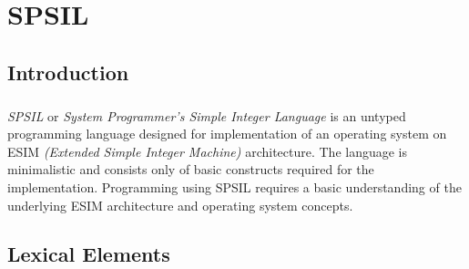 %
%
%
%
%
%
%
\chapter{SPSIL}
 \newcommand{\kw}[1]{\texttt{#1}}


\thispagestyle{plain}



\section{Introduction}
\paragraph{}
\textit{SPSIL} or \textit{System Programmer's Simple Integer Language} is an untyped programming language designed for implementation of an operating system on ESIM \textit{(Extended Simple Integer Machine)} architecture. The language is minimalistic and consists only of basic constructs required for the implementation. Programming using SPSIL requires a  basic understanding of the underlying ESIM architecture and operating system concepts. 



\section{Lexical Elements}




